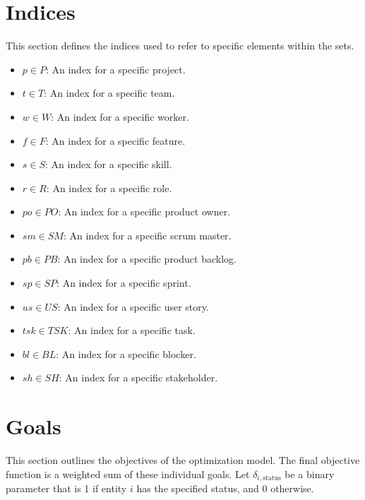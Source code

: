 \documentclass[11pt, a4paper]{article}
\begin{document}
\section{Indices}
This section defines the indices used to refer to specific elements within the sets.

\begin{itemize}
    \item $p \in P$: An index for a specific project.
    \item $t \in T$: An index for a specific team.
    \item $w \in W$: An index for a specific worker.
    \item $f \in F$: An index for a specific feature.
    \item $s \in S$: An index for a specific skill.
    \item $r \in R$: An index for a specific role.
    \item $po \in PO$: An index for a specific product owner.
    \item $sm \in SM$: An index for a specific scrum master.
    \item $pb \in PB$: An index for a specific product backlog.
    \item $sp \in SP$: An index for a specific sprint.
    \item $us \in US$: An index for a specific user story.
    \item $tsk \in TSK$: An index for a specific task.
    \item $bl \in BL$: An index for a specific blocker.
    \item $sh \in SH$: An index for a specific stakeholder.
\end{itemize}

\section{Goals}
This section outlines the objectives of the optimization model. The final objective function is a weighted sum of these individual goals. Let $\delta_{i, \text{status}}$ be a binary parameter that is 1 if entity $i$ has the specified status, and 0 otherwise.
\end{document}
